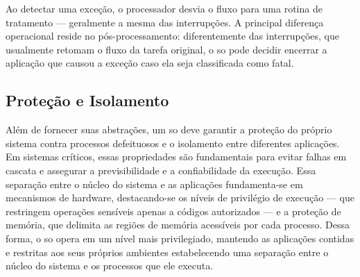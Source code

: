 Ao detectar uma exceção, o processador desvia o fluxo para uma rotina de tratamento --- geralmente a mesma das interrupções.
A principal diferença operacional reside no pós-processamento: diferentemente das interrupções, que usualmente retomam o fluxo da tarefa original,
o \gls{so} pode decidir encerrar a aplicação que causou a exceção caso ela seja classificada como fatal.

\subsection{Proteção e Isolamento}

Além de fornecer suas abstrações, um \gls{so} deve garantir a proteção do próprio sistema contra processos defeituosos e o isolamento entre diferentes aplicações.
Em sistemas críticos, essas propriedades são fundamentais para evitar falhas em cascata e assegurar a previsibilidade e a confiabilidade da execução.
Essa separação entre o núcleo do sistema e as aplicações fundamenta-se em mecanismos de hardware, destacando-se os níveis de privilégio de execução — que restringem operações
sensíveis apenas a códigos autorizados — e a proteção de memória, que delimita as regiões de memória acessíveis por cada processo. Dessa forma, o \gls{so} opera em um nível mais
privilegiado, mantendo as aplicações contidas e restritas aos seus próprios ambientes estabelecendo uma separação entre o núcleo do sistema e os processos que ele executa.

